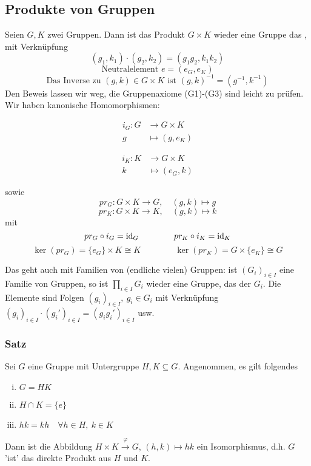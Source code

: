 \subsection{Produkte von Gruppen}
\label{sub:produkte}
Seien $G,K$ zwei Gruppen. 
Dann ist das Produkt $G\times K$ wieder eine Gruppe das , mit Verknüpfung 
\[
(g_1,k_1)\cdot(g_2,k_2)=(g_1g_2,k_1k_2) 
\]
\[
\text{Neutralelement } e=(e_G,e_K) 
\]
\[
\text{Das Inverse zu }(g,k)\in G\times K \text{ ist }(g,k)^{-1}=(g^{-1},k^{-1})
\]
Den Beweis lassen wir weg, die Gruppenaxiome (G1)-(G3) sind leicht zu prüfen.\\
Wir haben kanonische Homomorphismen:\\
\begin{minipage}[c]{8cm}
	\begin{equation*}
	\begin{aligned}
		i_G: G &\to G\times K\\
		g &\mapsto (g,e_K)
	\end{aligned}
	\end{equation*}
\end{minipage}
\begin{minipage}[c]{8cm}
	\begin{equation*}
	\begin{aligned}
	i_K: K &\to G\times K\\
	k &\mapsto (e_G,k)
	\end{aligned}
	\end{equation*}
\end{minipage}
sowie 
\[
pr_G:G\times K \to G,\quad (g,k)\mapsto g 
\]
\[
pr_K:G\times K \to K,\quad (g,k)\mapsto k 
\]
mit 
\[
pr_G\circ i_G=\operatorname{id}_G \qquad\qquad pr_K\circ i_K=\operatorname{id}_K 
\]
\[
\ker(pr_G)=\{e_G\}\times K\cong K \qquad\qquad \ker(pr_K)=G\times \{e_K\}\cong G 
\]

Das geht auch mit Familien von (endliche vielen) Gruppen: 
ist $(G_i)_{i\in I}$ eine Familie von Gruppen, so ist $\prod\limits_{i\in I}G_i$ wieder eine Gruppe, das  der $G_i$. 
Die Elemente sind Folgen $(g_i)_{i\in I},~g_i\in G_i$ mit Verknüpfung $(g_i)_{i\in I}\cdot (g_i')_{i\in I}=(g_ig_i')_{i\in I}$ usw.\\

\subsubsection*{Satz}
Sei $G$ eine Gruppe mit Untergruppe $H,K\subseteq G$.
Angenommen, es gilt folgendes
\begin{enumerate}[(i)]
	\item $G=HK$
	\item $H\cap K=\{e\}$
	\item $hk=kh\quad \forall h\in H,~k\in K$
\end{enumerate}
Dann ist die Abbildung $H\times K \stackrel{\varphi}{\to} G$, $(h,k)\mapsto hk$ ein Isomorphismus, d.h. $G$ 'ist' das direkte Produkt aus $H$ und $K$.

